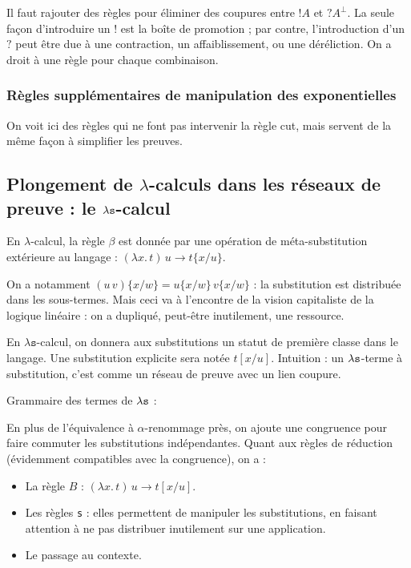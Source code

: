 \documentclass[a4paper, 11pt]{article}
\newcommand{\ofcourse}{\mathord{!}}
\newcommand{\whynot}{\mathord{?}}
\begin{document}
Il faut rajouter des règles pour éliminer des coupures entre $\ofcourse A$ et $\whynot A^\perp$. La seule façon d'introduire un $\ofcourse$ est la boîte de promotion ; par contre, l'introduction d'un $\whynot$ peut être due à une contraction, un affaiblissement, ou une déréliction. On a droit à une règle pour chaque combinaison.

\subsubsection{Règles supplémentaires de manipulation des exponentielles}

On voit ici des règles qui ne font pas intervenir la règle cut, mais servent de la même façon à simplifier les preuves.

\subsection{Plongement de $\lambda$-calculs dans les réseaux de preuve : le ${\lambda \mathtt{s}}$-calcul}

En $\lambda$-calcul, la règle $\beta$ est donnée par une opération de méta-substitution extérieure au langage : $(\lambda x.\,t)\, u \to t\{x / u \}$.

On a notamment $(u\,v)\{x/w\} = u\{x/w\}\,v\{x/w\}$ : la substitution est distribuée dans les sous-termes. Mais ceci va à l'encontre de la vision capitaliste de la logique linéaire : on a dupliqué, peut-être inutilement, une ressource.

En $\lambda \mathtt{s}$-calcul, on donnera aux substitutions un statut de première classe dans le langage. Une substitution explicite sera notée $t[x/u]$. Intuition : un ${\lambda \mathtt{s}}$-terme à substitution, c'est comme un réseau de preuve avec un lien coupure.

Grammaire des termes de ${\lambda \mathtt{s}}$ :

En plus de l'équivalence à $\alpha$-renommage près, on ajoute une congruence pour faire commuter les substitutions indépendantes. Quant aux règles de réduction (évidemment compatibles avec la congruence), on a :
\begin{itemize}
\item La règle $B$ : $(\lambda x.\,t)\, u \to t[x/u]$.
\item Les règles \texttt{s} : elles permettent de manipuler les substitutions, en faisant attention à ne pas distribuer inutilement sur une application.
\item Le passage au contexte.
\end{itemize}
\end{document}
